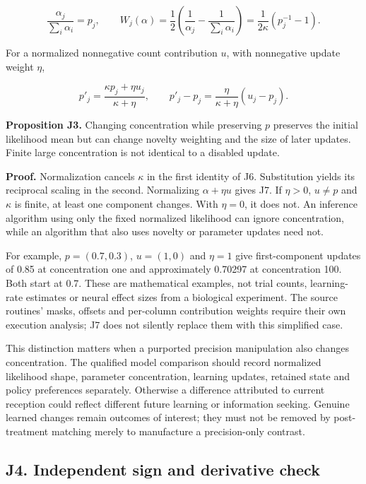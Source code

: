 \documentclass[
  american,
  11pt,
  letterpaper,
]{article}
\begin{document}
\begin{equation}
\frac{\alpha_j}{\sum_i\alpha_i}=p_j,\qquad
W_j(\alpha)=\frac12\left(\frac1{\alpha_j}-\frac1{\sum_i\alpha_i}\right)
           =\frac1{2\kappa}(p_j^{-1}-1).
\tag{J6}
\end{equation}

For a normalized nonnegative count contribution \(u\), with nonnegative update weight \(\eta\),

\begin{equation}
p'_j=\frac{\kappa p_j+\eta u_j}{\kappa+\eta},\qquad
p'_j-p_j=\frac{\eta}{\kappa+\eta}(u_j-p_j).
\tag{J7}
\end{equation}

\textbf{Proposition J3.} Changing concentration while preserving \(p\) preserves the initial likelihood mean but can change novelty weighting and the size of later updates. Finite large concentration is not identical to a disabled update.

\textbf{Proof.} Normalization cancels \(\kappa\) in the first identity of J6. Substitution yields its reciprocal scaling in the second. Normalizing \(\alpha+\eta u\) gives J7. If \(\eta>0\), \(u\ne p\) and \(\kappa\) is finite, at least one component changes. With \(\eta=0\), it does not. An inference algorithm using only the fixed normalized likelihood can ignore concentration, while an algorithm that also uses novelty or parameter updates need not.

For example, \(p=(0.7,0.3)\), \(u=(1,0)\) and \(\eta=1\) give first-component updates of 0.85 at concentration one and approximately 0.70297 at concentration 100. Both start at 0.7. These are mathematical examples, not trial counts, learning-rate estimates or neural effect sizes from a biological experiment. The source routines' masks, offsets and per-column contribution weights require their own execution analysis; J7 does not silently replace them with this simplified case.

This distinction matters when a purported precision manipulation also changes concentration. The qualified model comparison should record normalized likelihood shape, parameter concentration, learning updates, retained state and policy preferences separately. Otherwise a difference attributed to current reception could reflect different future learning or information seeking. Genuine learned changes remain outcomes of interest; they must not be removed by post-treatment matching merely to manufacture a precision-only contrast.

\subsection{J4. Independent sign and derivative check}\label{j4.-independent-sign-and-derivative-check}
\end{document}
